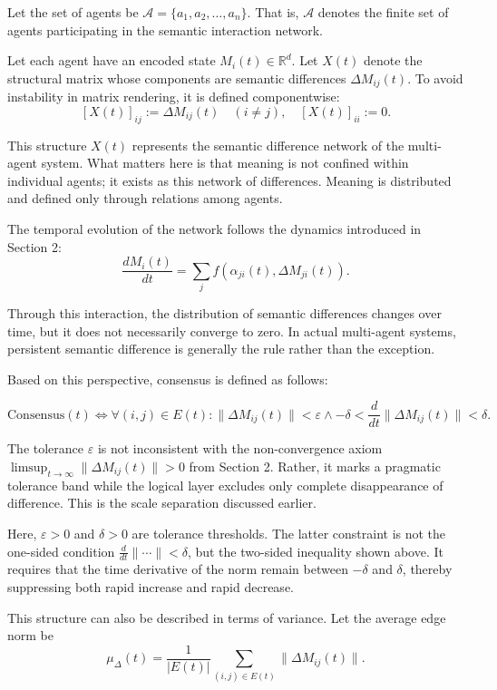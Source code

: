 \documentclass[11pt,a4paper]{article}
\theoremstyle{definition}
\begin{document}
Let the set of agents be $\mathcal{A} = \{a_1, a_2, \ldots, a_n\}$. That is, $\mathcal{A}$ denotes the finite set of agents participating in the semantic interaction network.

Let each agent have an encoded state $M_i(t) \in \mathbb{R}^d$. Let $X(t)$ denote the structural matrix whose components are semantic differences $\Delta M_{ij}(t)$. To avoid instability in matrix rendering, it is defined componentwise:
\[
[X(t)]_{ij} := \Delta M_{ij}(t) \quad (i \neq j), \quad [X(t)]_{ii} := 0.
\]

This structure $X(t)$ represents the semantic difference network of the multi-agent system. What matters here is that meaning is not confined within individual agents; it exists as this network of differences. Meaning is distributed and defined only through relations among agents.

The temporal evolution of the network follows the dynamics introduced in Section 2:
\[
\frac{dM_i(t)}{dt} = \sum_j f(\alpha_{ji}(t), \Delta M_{ji}(t)).
\]

Through this interaction, the distribution of semantic differences changes over time, but it does not necessarily converge to zero. In actual multi-agent systems, persistent semantic difference is generally the rule rather than the exception.

Based on this perspective, consensus is defined as follows:

\[
\text{Consensus}(t) \Leftrightarrow \forall (i,j) \in E(t) : \|\Delta M_{ij}(t)\| < \varepsilon \land -\delta < \frac{d}{dt}\|\Delta M_{ij}(t)\| < \delta.
\]

The tolerance $\varepsilon$ is not inconsistent with the non-convergence axiom $\limsup_{t \to \infty} \|\Delta M_{ij}(t)\| > 0$ from Section 2. Rather, it marks a pragmatic tolerance band while the logical layer excludes only complete disappearance of difference. This is the scale separation discussed earlier.

Here, $\varepsilon > 0$ and $\delta > 0$ are tolerance thresholds. The latter constraint is not the one-sided condition $\frac{d}{dt}\|\cdots\| < \delta$, but the two-sided inequality shown above. It requires that the time derivative of the norm remain between $-\delta$ and $\delta$, thereby suppressing both rapid increase and rapid decrease.

This structure can also be described in terms of variance. Let the average edge norm be
\[
\mu_\Delta(t) = \frac{1}{|E(t)|} \sum_{(i,j) \in E(t)} \|\Delta M_{ij}(t)\|.
\]
\end{document}
